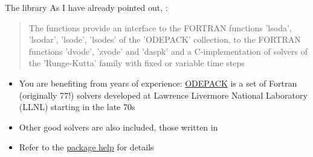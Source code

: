\documentclass[aspectratio=169]{beamer}\usepackage[]{graphicx}\usepackage[]{xcolor}
\begin{document}


\begin{frame}{The  library}
As I have already pointed out, \href{https://cran.r-project.org/web/packages/deSolve/index.html}{}:
\begin{quotation}
    The functions provide an interface to the FORTRAN functions 'lsoda', 'lsodar', 'lsode', 'lsodes' of the 'ODEPACK' collection, to the FORTRAN functions 'dvode', 'zvode' and 'daspk' and a C-implementation of solvers of the 'Runge-Kutta' family with fixed or variable time steps
\end{quotation}
\vfill
\begin{itemize}
  \item You are benefiting from years of experience: \href{https://computing.llnl.gov/projects/odepack}{ODEPACK} is a set of Fortran (originally 77!) solvers developed at Lawrence Livermore National Laboratory (LLNL) starting in the late 70s
  \vfill
  \item Other good solvers are also included, those written in 
  \vfill
  \item Refer to the \href{https://cran.r-project.org/web/packages/deSolve/deSolve.pdf}{package help} for details
\end{itemize}
\end{frame}
\end{document}
